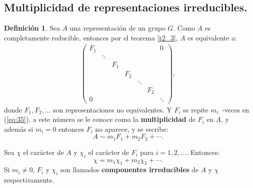 \documentclass[12pt]{book}
\theoremstyle{definition}
\newtheorem{definition}[theorem]{Definición}
\newcounter{in}
\newcounter{ini}
\begin{document}
\subsection{Multiplicidad de representaciones irreducibles.}
\label{subsec:mri}
\begin{definition}
 Sea $A$ una representación de un grupo $G$. Como $A$ es completamente
reducible, entonces por el teorema \ref{t2_3}, $A$ es equivalente a:
\begin{equation}
  \label{eq:35}
  \begin{aligned}
    \begin{pmatrix}
      F_{1} & & & & & & 0\\ 
      & \ddots & & & & & \\
      & & F_{1} & & & & \\
      & & & F_{2} & & & \\
      & & & & \ddots & & \\
      & & & & & F_{2} & \\
      0 & & & & & & \ddots
    \end{pmatrix},
  \end{aligned}
\end{equation}
donde $F_{1}, F_{2}, \ldots$ son representaciones no equivalentes. Y
$F_{i}$ se repite $m_{i}$~-veces en (\ref{eq:35}), a este número se le
conoce como la \textbf{multiplicidad} de $F_{i}$ en $A$, y además si $m_{i}=0$
entonces $F_{i}$ no aparece, y se escribe:
\begin{equation}
  \label{eq:36}
  A \sim m_{1} F_{1}+ m_{2} F_{2}+ \cdots .
\end{equation}
\end{definition}
Sea $\chi$ el carácter de $A$ y $\chi_{i}$ el carácter de $F_{i}$
para $i = 1, 2, ...$. Entonces:
\begin{equation}
  \label{eq:37}
  \chi =m_{1} \chi_{1}+ m_{2} \chi_{2}+ \cdots .
\end{equation}
Si $m_{i} \neq 0$, $F_{i}$ y $\chi_{i}$ son llamados \textbf{componentes
irreducibles} de $A$ y $\chi$ respectivamente.
\end{document}
